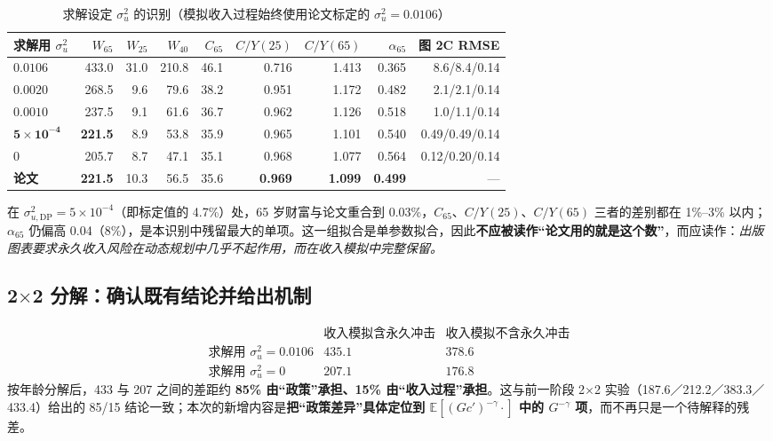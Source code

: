 \documentclass[UTF8,a4paper,11pt,fontset=fandol]{ctexart}
\newcommand{\su}{\sigma_u^2}
\newcommand{\suDP}{\sigma_{u,\mathrm{DP}}^{2}}
\begin{document}
\begin{table}[htbp]\centering\small
\caption{求解设定 \(\su\) 的识别（模拟收入过程始终使用论文标定的 \(\su=0.0106\)）}\vspace{-2pt}
\begin{tabular}{@{}lrrrrrrrr@{}}\toprule
求解用 \(\su\) & \(W_{65}\) & \(W_{25}\) & \(W_{40}\) & \(C_{65}\) & \(C/Y(25)\) & \(C/Y(65)\) & \(\alpha_{65}\) & 图 2C RMSE\\\midrule
\(0.0106\) & 433.0 & 31.0 & 210.8 & 46.1 & 0.716 & 1.413 & 0.365 & 8.6/8.4/0.14\\
\(0.0020\) & 268.5 & 9.6 & 79.6 & 38.2 & 0.951 & 1.172 & 0.482 & 2.1/2.1/0.14\\
\(0.0010\) & 237.5 & 9.1 & 61.6 & 36.7 & 0.962 & 1.126 & 0.518 & 1.0/1.1/0.14\\
\(\mathbf{5\times10^{-4}}\) & \textbf{221.5} & 8.9 & 53.8 & 35.9 & 0.965 & 1.101 & 0.540 & 0.49/0.49/0.14\\
\(0\) & 205.7 & 8.7 & 47.1 & 35.1 & 0.968 & 1.077 & 0.564 & 0.12/0.20/0.14\\\midrule
\textbf{论文} & \textbf{221.5} & 10.3 & 56.5 & 35.6 & \textbf{0.969} & \textbf{1.099} & \textbf{0.499} & ---\\\bottomrule
\end{tabular}
\end{table}

在 \(\suDP=5\times10^{-4}\)（即标定值的 4.7\%）处，65 岁财富与论文重合到 0.03\%，\(C_{65}\)、\(C/Y(25)\)、\(C/Y(65)\) 三者的差别都在 1\%--3\% 以内；\(\alpha_{65}\) 仍偏高 0.04（8\%），是本识别中残留最大的单项。这一组拟合是单参数拟合，因此\textbf{不应被读作“论文用的就是这个数”}，而应读作：\emph{出版图表要求永久收入风险在动态规划中几乎不起作用，而在收入模拟中完整保留。}

\subsection{2\(\times\)2 分解：确认既有结论并给出机制}
\[
\begin{array}{c|cc}
& \text{收入模拟含永久冲击} & \text{收入模拟不含永久冲击}\\
\hline
\text{求解用 }\su=0.0106 & \mathbf{435.1} & 378.6\\
\text{求解用 }\su=0 & 207.1 & 176.8
\end{array}
\]
按年龄分解后，433 与 207 之间的差距约 \textbf{85\% 由“政策”承担、15\% 由“收入过程”承担}。这与前一阶段 2\(\times\)2 实验（187.6／212.2／383.3／433.4）给出的 85/15 结论一致；本次的新增内容是\textbf{把“政策差异”具体定位到 \(\mathbb{E}[(Gc')^{-\gamma}\cdot]\) 中的 \(G^{-\gamma}\) 项}，而不再只是一个待解释的残差。
\end{document}

